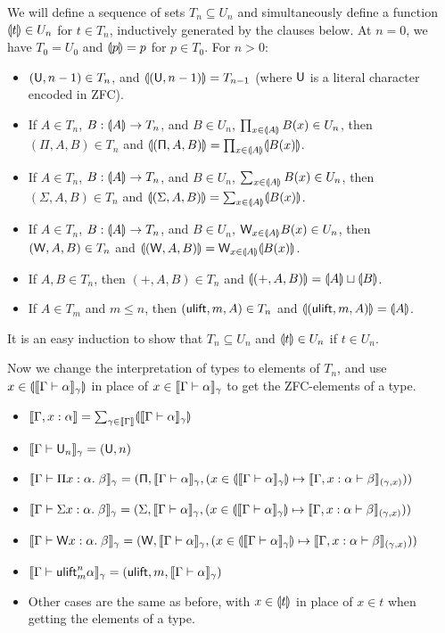 We will define a sequence of sets $T_n\subseteq U_n$ and simultaneously define a function $\llparenthesis t\rrparenthesis\in U_n$ for $t\in T_n$, inductively generated by the clauses below. At $n=0$, we have $T_0=U_0$ and $\llparenthesis p\rrparenthesis=p$ for $p\in T_0$. For $n>0$:
\begin{itemize}
\item $(\mathsf{U},n-1)\in T_n$, and $\llparenthesis (\mathsf{U},n-1)\rrparenthesis=T_{n-1}$ (where $\mathsf{U}$ is a literal character encoded in ZFC).
\item If $A\in T_n$, $B:\llparenthesis A\rrparenthesis\to T_n$, and $B\in U_n$, $\prod_{x\in\llparenthesis A\rrparenthesis}B(x)\in U_n$, then $(\mathsf{\Pi},A,B)\in T_n$ and $\llparenthesis (\mathsf{\Pi},A,B)\rrparenthesis=\prod_{x\in\llparenthesis A\rrparenthesis}\llparenthesis B(x)\rrparenthesis$.
\item If $A\in T_n$, $B:\llparenthesis A\rrparenthesis\to T_n$, and $B\in U_n$, $\sum_{x\in\llparenthesis A\rrparenthesis}B(x)\in U_n$, then $(\mathsf{\Sigma},A,B)\in T_n$ and $\ttag{(\mathsf{\Sigma},A,B)}=\sum_{x\in\ttag{A}}\ttag{B(x)}$.
\item If $A\in T_n$, $B:\llparenthesis A\rrparenthesis\to T_n$, and $B\in U_n$, $\mathsf{W}_{x\in\llparenthesis A\rrparenthesis}B(x)\in U_n$, then $(\mathsf{\mathsf{W}},A,B)\in T_n$ and $\llparenthesis (\mathsf{W},A,B)\rrparenthesis=\mathsf{W}_{x\in\llparenthesis A\rrparenthesis}\llparenthesis B(x)\rrparenthesis$.
\item If $A,B\in T_n$, then $(\mathsf{+},A,B)\in T_n$ and $\llparenthesis (\mathsf{+},A,B)\rrparenthesis=\llparenthesis A\rrparenthesis\sqcup\llparenthesis B\rrparenthesis$.
\item If $A\in T_m$ and $m\le n$, then $(\mathsf{ulift},m,A)\in T_n$ and $\llparenthesis (\mathsf{ulift},m,A)\rrparenthesis=\llparenthesis A\rrparenthesis$.
\end{itemize}
It is an easy induction to show that $T_n\subseteq U_n$ and $\llparenthesis t\rrparenthesis\in U_n$ if $t\in U_n$.

Now we change the interpretation of types to elements of $T_n$, and use $x\in\ttag{\scott{\Gamma\vdash\alpha}_\gamma}$ in place of $x\in\scott{\Gamma\vdash\alpha}_\gamma$ to get the ZFC-elements of a type.
\begin{itemize}
\item $\scott{\Gamma,x:\alpha}=\sum_{\gamma\in\scott{\Gamma}}\ttag{\scott{\Gamma\vdash\alpha}_\gamma}$
\item $\scott{\Gamma\vdash\U_n}_\gamma=(\U,n)$
\item $\scott{\Gamma\vdash \Pi x:\alpha.\;\beta}_\gamma=(\mathsf{\Pi},\scott{\Gamma\vdash\alpha}_\gamma,(x\in\ttag{\scott{\Gamma\vdash\alpha}_\gamma}\mapsto\scott{\Gamma,x:\alpha\vdash\beta}_{(\gamma,x)}))$
\item $\scott{\Gamma\vdash \Sigma x:\alpha.\;\beta}_\gamma=(\mathsf{\Sigma},\scott{\Gamma\vdash\alpha}_\gamma,(x\in\ttag{\scott{\Gamma\vdash\alpha}_\gamma}\mapsto\scott{\Gamma,x:\alpha\vdash\beta}_{(\gamma,x)}))$
\item $\scott{\Gamma\vdash \W x:\alpha.\;\beta}_\gamma=(\W,\scott{\Gamma\vdash\alpha}_\gamma,(x\in\ttag{\scott{\Gamma\vdash\alpha}_\gamma}\mapsto\scott{\Gamma,x:\alpha\vdash\beta}_{(\gamma,x)}))$
\item $\scott{\Gamma\vdash\ulift_m^n \alpha}_\gamma=(\ulift,m,\scott{\Gamma\vdash\alpha}_\gamma)$
\item Other cases are the same as before, with $x\in\llparenthesis t\rrparenthesis$ in place of $x\in t$ when getting the elements of a type.
\end{itemize}

